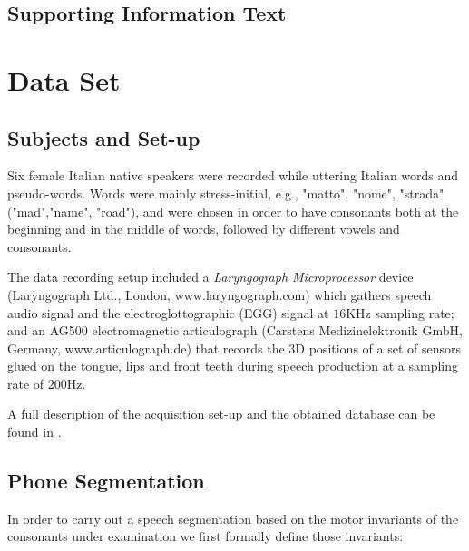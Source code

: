 \documentclass[10pt]{article}
\begin{document}
\begin{center}
\section*{Supporting Information Text}
\end{center}

\section{Data Set}

\subsection{Subjects and Set-up}

Six female Italian native speakers were recorded while uttering
Italian words and pseudo-words.
 Words were mainly stress-initial, e.g.,
"matto", "nome", "strada" ("mad","name", "road"), and were chosen in order
to have consonants both at the beginning and in the middle of
words, followed by different vowels and consonants.

The data recording setup included a \emph{Laryngograph Microprocessor}
device (Laryngograph Ltd., London, www.laryngograph.com) which gathers speech audio
signal and the electroglottographic (EGG) signal at $16$KHz sampling
rate; and an AG500 electromagnetic articulograph (Carstens Medizinelektronik
GmbH, Germany, www.articulograph.de) that records the
3D positions of a set of sensors glued on the tongue, lips and front teeth
during speech production at a sampling rate of $200$Hz. 

A full description of the 
acquisition set-up and the obtained database can be found in \cite{tavella}.

\subsection{Phone Segmentation}
In order to carry out a speech segmentation based on the motor invariants of the consonants under
examination we first formally define those invariants:
\end{document}

